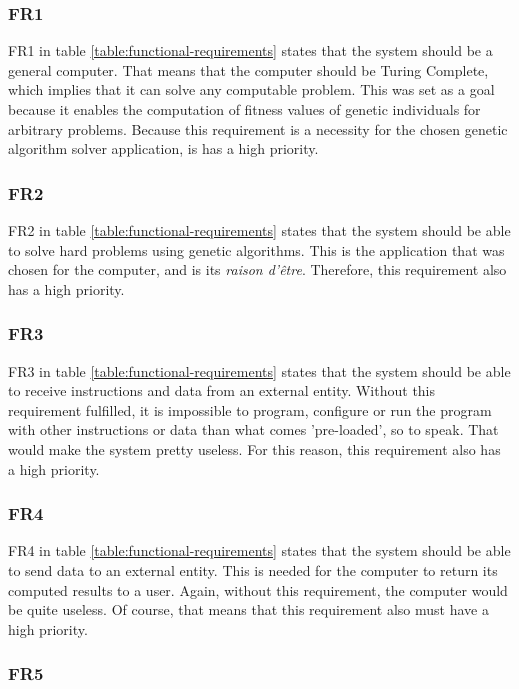 \subsubsection{FR1}

 FR1 in table \vref{table:functional-requirements} states that the system should be a general computer.
 That means that the computer should be Turing Complete, which implies that it can solve any computable problem.
 This was set as a goal because it enables the computation of fitness values of genetic individuals for arbitrary problems. 
 Because this requirement is a necessity for the chosen genetic algorithm solver application, is has a high priority.

\subsubsection{FR2}

FR2 in table \vref{table:functional-requirements} states that the system should be able to solve hard problems using genetic algorithms.
This is the application that was chosen for the computer, and is its \textit{raison d'être}.
Therefore, this requirement also has a high priority.

\subsubsection{FR3}

FR3 in table \vref{table:functional-requirements} states that the system should be able to receive instructions and data from an external entity.
Without this requirement fulfilled, it is impossible to program, configure or run the program with other instructions or data than what comes 'pre-loaded', so to speak.
That would make the system pretty useless.
For this reason, this requirement also has a high priority.

\subsubsection{FR4}

FR4 in table \vref{table:functional-requirements} states that the system should be able to send data to an external entity.
This is needed for the computer to return its computed results to a user.
Again, without this requirement, the computer would be quite useless.
Of course, that means that this requirement also must have a high priority.

\subsubsection{FR5}


